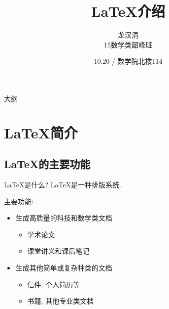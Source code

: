 \documentclass[UTF8]{ctexbeamer}
\title[\LaTeX 介绍] %
{\LaTeX 介绍}
\subtitle
{} %
\author[龙汉清] %
{龙汉清\\
15数学类韶峰班 }
\institute[Universities of Somewhere and Elsewhere] %
{
 
  数学与计算科学学院\\
  湘潭大学
}
\date[Short Occasion] %
{10.20 / 数学院北楼114}
\begin{document}
\begin{frame}
  \titlepage
\end{frame}

\begin{frame}{大纲}
  \tableofcontents
\end{frame}




\section{\LaTeX 简介}

\subsection[\LaTeX 的主要功能]{\LaTeX 的主要功能}

\begin{frame}{\LaTeX 是什么?}\pause
\LaTeX 是一种排版系统.\pause


主要功能: \pause
  \begin{itemize}
  \item 生成高质量的科技和数学类文档
    \begin{itemize}
    \item
      学术论文
    \item    
      课堂讲义和课后笔记
    \end{itemize}\pause
  \item
    生成其他简单或复杂种类的文档
    \begin{itemize}
    \item
      信件, 个人简历等
    \item
      书籍, 其他专业类文档
    \end{itemize}
  \end{itemize}
\end{frame}
\end{document}
